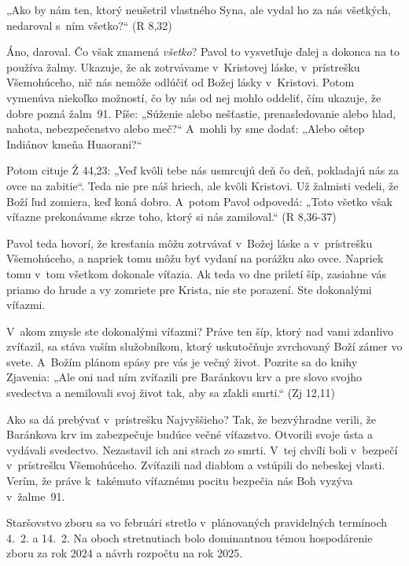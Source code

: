 „Ako by nám ten, ktorý neušetril vlastného Syna, ale vydal ho za nás všetkých, nedaroval s~ním všetko?“ (R 8,32)

Áno, daroval. Čo však znamená {\em všetko}? Pavol to vysvetľuje ďalej a dokonca na to používa žalmy. Ukazuje, že ak zotrvávame v~Kristovej láske, v~prístrešku Všemohúceho, nič nás nemôže odlúčiť od Božej lásky v~Kristovi. Potom vymenúva niekoľko možností, čo by nás od nej mohlo oddeliť, čím ukazuje, že dobre pozná žalm~91. Píše: „Súženie alebo nešťastie, prenasledovanie alebo hlad, nahota, nebezpečenstvo alebo meč?“ A~mohli by sme dodať: „Alebo oštep Indiánov kmeňa Huaorani?“

Potom cituje Ž 44,23: „Veď kvôli tebe nás usmrcujú deň čo deň, pokladajú nás za ovce na zabitie“. Teda nie pre náš hriech, ale kvôli Kristovi. Už žalmisti vedeli, že Boží ľud zomiera, keď koná dobro. A~potom Pavol odpovedá: „Toto všetko však víťazne prekonávame skrze toho, ktorý si nás zamiloval.“ (R 8,36-37)

Pavol teda hovorí, že kresťania môžu zotrvávať v~Božej láske a v~prístrešku Všemohúceho, a napriek tomu môžu byť vydaní na porážku ako ovce. Napriek tomu v~tom všetkom dokonale víťazia. Ak teda vo dne priletí šíp, zasiahne vás priamo do hrude a vy zomriete pre Krista, nie ste porazení. Ste dokonalými víťazmi.


V~akom zmysle ste dokonalými víťazmi? Práve ten šíp, ktorý nad vami zdanlivo zvíťazil, sa stáva vaším služobníkom, ktorý uskutočňuje zvrchovaný Boží zámer vo svete. A~Božím plánom spásy pre vás je večný život. Pozrite sa do knihy Zjavenia: „Ale oni nad ním zvíťazili pre Baránkovu krv a pre slovo svojho svedectva a nemilovali svoj život tak, aby sa zľakli smrti.“ (Zj 12,11)

Ako sa dá prebývať v~prístrešku Najvyššieho? Tak, že bezvýhradne verili, že Baránkova krv im zabezpečuje budúce večné víťazstvo. Otvorili svoje ústa a vydávali svedectvo. Nezastavil ich ani strach zo smrti. V~tej chvíli boli v~bezpečí v~prístrešku Všemohúceho. Zvíťazili nad diablom a vstúpili do nebeskej vlasti. Verím, že práve k~takémuto víťaznému pocitu bezpečia nás Boh vyzýva v~žalme~91.




Staršovstvo zboru sa vo februári stretlo v~plánovaných pravidelných termínoch 4.~2. a 14.~2. Na oboch stretnutiach bolo dominantnou témou hospodárenie zboru za rok 2024 a návrh rozpočtu na rok 2025.

